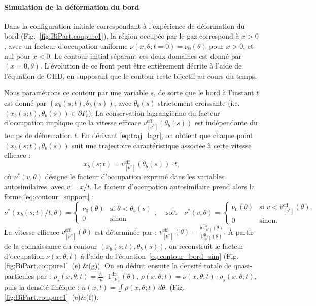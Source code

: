 \paragraph{Simulation de la déformation du bord}

Dans la configuration initiale correspondant à l'expérience de déformation du bord (Fig.~\ref{fig:BiPart.coupure1}), la région occupée par le gaz correspond à \(x > 0\), avec un facteur d’occupation uniforme \(\nu(x,\theta; t=0) = \nu_0(\theta)\) pour \(x > 0\), et nul pour \(x < 0\). Le contour initial séparant ces deux domaines est donné par \((x = 0, \theta)\). L’évolution de ce front peut être entièrement décrite à l’aide de l’équation de GHD, en supposant que le contour reste bijectif au cours du temps.


Nous paramétrons ce contour par une variable \(s\), de sorte que le bord à l’instant \(t\) est donné par \((x_b(s;t), \theta_b(s))\), avec \(\theta_b(s)\) strictement croissante (i.e. \((x_b(s;t), \theta_b(s)) \in \partial \Gamma_t\)).  
La conservation lagrangienne du facteur d’occupation implique que la vitesse efficace \(v^{\mathrm{eff}}_{[\nu^\ast]}(\theta_b(s))\) est indépendante du temps de déformation \(t\).  
En dérivant \eqref{eq:traj_lagr}, on obtient que chaque point \((x_b(s;t), \theta_b(s))\) suit une trajectoire caractéristique associée à cette vitesse efficace :
\[
x_b(s;t) = v^{\mathrm{eff}}_{[\nu^\ast]}(\theta_b(s)) \cdot t,
\]
où \(\nu^\ast(v, \theta)\) désigne le facteur d’occupation exprimé dans les variables autosimilaires, avec \(v = x/t\).
Le facteur d’occupation autosimilaire prend alors la forme \eqref{eq:contour_support} :
\begin{equation}
\label{eq:contour_bord_sim}
\nu^\ast(x_b(s;t)/t,\theta)  =  	 \begin{cases} \nu_0(\theta) & \text{si }  \theta < \theta_b(s) \\ 0 & \text{sinon} \end{cases}, \, \quad \mbox{soit} \quad  	
\nu^\ast(v,\theta) = 
\begin{cases}
\nu_0(\theta) & \text{si }  v < v^{\mathrm{eff}}_{[\nu^\ast]}(\theta), \\
0 & \text{sinon} .
\end{cases}
\end{equation}
La vitesse efficace \(v^{\mathrm{eff}}_{[\nu^\ast]}(\theta)\) est déterminée par :
\(
v^{\mathrm{eff}}_{[\nu^\ast]}(\theta) = \frac{\mathrm{id}^{\mathrm{dr}}_{[\nu^\ast]}(\theta)}{\mathrm{1}^{\mathrm{dr}}_{[\nu^\ast]}(\theta)}.
\)
À partir de la connaissance du contour \((x_b(s;t), \theta_b(s))\), on reconstruit le facteur d’occupation \(\nu(x,\theta; t)\) à l’aide de l’équation~\eqref{eq:contour_bord_sim} (Fig. \ref{fig:BiPart.coupure1}~(e) $\&$(g)). On en déduit ensuite la densité totale de quasi-particules par :
\(
\rho_s(x,\theta;t) = \frac{\hbar}{m} \cdot 1^{\mathrm{dr}}_{[\nu]}(\theta),
\,
\rho(x,\theta;t) = \nu(x,\theta;t) \cdot \rho_s(x,\theta;t),
\)
puis la densité linéique :
\(
n(x,t) = \int \rho(x,\theta;t)\, d\theta.
\)
(Fig. \ref{fig:BiPart.coupure1}~(e)$\&$(f)).

